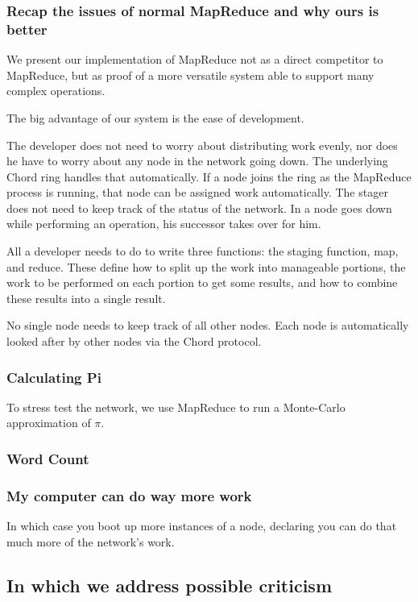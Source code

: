 \documentclass[conference, compsocconf, letterpaper]{IEEEtran}
\begin{document}
\subsubsection{Recap the issues  of normal MapReduce  and why ours is better} 
We present our implementation of MapReduce not as a direct competitor to MapReduce, but as proof of a more versatile system able to support many complex operations.

The big advantage of our system is the ease of development.  

The developer does not need to worry about distributing work evenly, nor does he have to worry about any node in the network going down.  The underlying Chord ring handles that automatically.  If a node joins the ring as the MapReduce process is running, that node can be assigned work automatically.  The stager does not need to keep track of the status of the network.  In a node goes down while performing an operation, his successor takes over for him.

All a developer needs to do to write three functions: the staging function, map, and reduce.  These define how to split up the work into manageable portions,  the  work to be performed on each portion to get some results, and how to combine these results into a single result. 

No single node needs to keep track of all other nodes.  Each node is automatically looked after by  other nodes via the Chord protocol.  



\subsubsection{Calculating Pi}
To stress test the network, we use MapReduce to run a Monte-Carlo approximation of $\pi$. 


\subsubsection{Word Count}

\subsubsection{My computer can do way more work}  In which case you boot up more instances of a node, declaring you can do that much more of the network's work.


\subsection{In which we address possible criticism}
\end{document}
